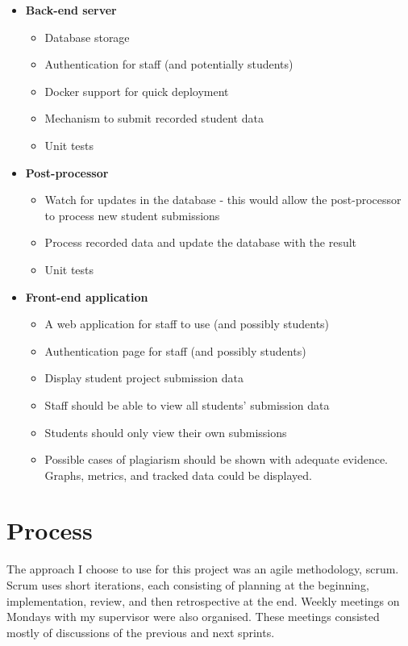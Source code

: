 \begin{itemize}
\begin{itemize}
    \item \textbf{Back-end server}
    \begin{itemize}
      \item Database storage
      \item Authentication for staff (and potentially students)
      \item Docker support for quick deployment
      \item Mechanism to submit recorded student data
      \item Unit tests
    \end{itemize}

    \item \textbf{Post-processor}
    \begin{itemize}
      \item Watch for updates in the database - this would allow the post-processor to process new student submissions
      \item Process recorded data and update the database with the result
      \item Unit tests
    \end{itemize}

    \item \textbf{Front-end application}
    \begin{itemize}
      \item A web application for staff to use (and possibly students)
      \item Authentication page for staff (and possibly students)
      \item Display student project submission data
      \item Staff should be able to view all students' submission data
      \item Students should only view their own submissions
      \item Possible cases of plagiarism should be shown with adequate evidence. Graphs, metrics, and tracked data could be displayed.
    \end{itemize}
  \end{itemize}
\end{itemize}

\section{Process}
The approach I choose to use for this project was an agile methodology, scrum. Scrum uses short iterations, each consisting of planning at the beginning, implementation, review, and then retrospective at the end. Weekly meetings on Mondays with my supervisor were also organised. These meetings consisted mostly of discussions of the previous and next sprints.

